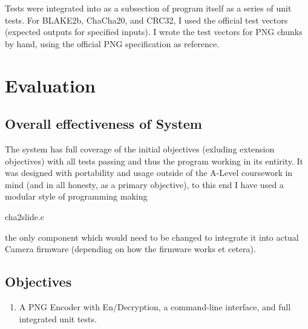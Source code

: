 \documentclass{report}
\begin{document}
Tests were integrated into as a subsection of program itself as a series of unit tests. For BLAKE2b, ChaCha20, and CRC32, I used the official test vectors (expected outputs for specified inputs). I wrote the test vectors for PNG chunks by hand, using the official PNG specification as reference.

\chapter{Evaluation}

\section{Overall effectiveness of System}

The system has full coverage of the initial objectives (exluding extension objectives) with all tests passing and thus the program working in its entirity. It was designed with portability and usage outside of the A-Level coursework in mind (and in all honesty, as a primary objective), to this end I have used a modular style of programming making \begin{texttt}cha2slide.c\end{texttt} the only component which would need to be changed to integrate it into actual Camera firmware (depending on how the firmware works et cetera).

\section{Objectives}

\begin{enumerate}
\item A PNG Encoder with En/Decryption, a command-line interface, and full integrated unit tests. \checkmark
\end{enumerate}
\end{document}
